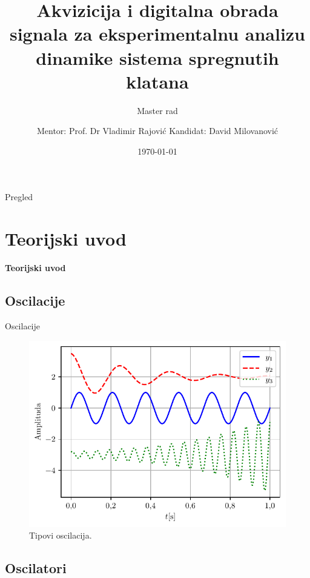 \documentclass[aspectratio=169,xcolor=dvipsnames]{beamer}
\title[short title]{Akvizicija i digitalna obrada signala za eksperimentalnu analizu dinamike sistema spregnutih klatana} %
\subtitle{Master rad}
\author {Mentor: Prof. Dr Vladimir Rajović
\qquad\qquad
\hfill Kandidat: David Milovanović
}
\institute[NTU] %
{
    Univerzitet u Beogradu \\
    Elektrotehnički fakultet %
}
\date{\today} %
\begin{document}
\begin{frame}
    \titlepage
\end{frame}

\begin{frame}{Pregled}
    \tableofcontents
\end{frame}

\section{Teorijski uvod}

\begin{frame}
    \Huge{\centerline{\textbf{Teorijski uvod}}}
\end{frame}


\subsection{Oscilacije}

\begin{frame}{Oscilacije}
    \begin{figure}
    \includegraphics[width=0.5\linewidth]{master_fig/osc_py.pdf}
    \caption{Tipovi oscilacija.}
    \end{figure}
\end{frame}

\subsection{Oscilatori}
\end{document}
